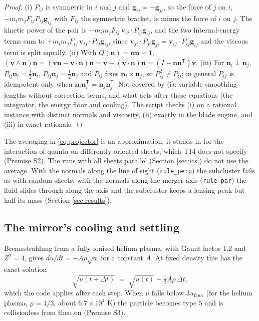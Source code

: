 \documentclass[11pt]{article}
\theoremstyle{definition}
\begin{document}
\begin{proof}
(i) $P_{ij}$ is symmetric in $i$ and $j$ and $\mathbf{g}_{ij} = -\mathbf{g}_{ji}$, so the force of $j$ on $i$, $-m_{i}m_{j}F_{ij}P_{ij}\mathbf{g}_{ij}$ with $F_{ij}$ the symmetric bracket, is minus the force of $i$ on $j$. The kinetic power of the pair is $-m_{i}m_{j}F_{ij}\,\mathbf{v}_{ij}\cdot P_{ij}\mathbf{g}_{ij}$, and the two internal-energy terms sum to $+m_{i}m_{j}F_{ij}\,\mathbf{v}_{ij}\cdot P_{ij}\mathbf{g}_{ij}$, since $\mathbf{v}_{ji}\cdot P_{ji}\mathbf{g}_{ji} = \mathbf{v}_{ij}\cdot P_{ij}\mathbf{g}_{ij}$ and the viscous term is split equally. (ii) With $Q(\mathbf{n}) = \mathbf{n}\mathbf{n} = 1$, $(\mathbf{v}\wedge\mathbf{n})\mathbf{n} = (\mathbf{v}\mathbf{n} - \mathbf{v}\cdot\mathbf{n})\mathbf{n} = \mathbf{v} - (\mathbf{v}\cdot\mathbf{n})\mathbf{n} = (I - \mathbf{n}\mathbf{n}^{\mathsf T})\mathbf{v}$. (iii) For $\mathbf{n}_{i}\perp\mathbf{n}_{j}$, $P_{ij}\mathbf{n}_{i} = \tfrac{1}{2}\mathbf{n}_{i}$, $P_{ij}\mathbf{n}_{j} = \tfrac{1}{2}\mathbf{n}_{j}$ and $P_{ij}$ fixes $\mathbf{n}_{i}\times\mathbf{n}_{j}$, so $P_{ij}^{2} \ne P_{ij}$; in general $P_{ij}$ is idempotent only when $\mathbf{n}_{i}\mathbf{n}_{i}^{\mathsf T} = \mathbf{n}_{j}\mathbf{n}_{j}^{\mathsf T}$. Not covered by (i): variable smoothing lengths without correction terms, and what acts after these equations (the integrator, the energy floor and cooling). The script checks (i) on a rational instance with distinct normals and viscosity, (ii) exactly in the blade engine, and (iii) in exact rationals.
\end{proof}

The averaging in \eqref{eq:projector} is an approximation: it stands in for the interaction of quanta on differently oriented sheets, which T14 does not specify (Premise S2). The runs with all sheets parallel (Section \ref{sec:ics}) do not use the average. With the normals along the line of sight (\texttt{rule\_perp}) the subcluster fails as with random sheets; with the normals along the merger axis (\texttt{rule\_par}) the fluid slides through along the axis and the subcluster keeps a lensing peak but half its mass (Section \ref{sec:results}).

\subsection{The mirror's cooling and settling}

Bremsstrahlung from a fully ionised helium plasma, with Gaunt factor $1.2$ and $Z^{2} = 4$, gives $du/dt = -A\rho\sqrt{u}$ for a constant $A$. At fixed density this has the exact solution
\[
\sqrt{u(t + \Delta t)} \;=\; \sqrt{u(t)} - \tfrac{1}{2}A\rho\,\Delta t ,
\]
which the code applies after each step. When $u$ falls below $3u_{\mathrm{floor}}$ (for the helium plasma, $\mu = 4/3$, about $6.7 \times 10^{4}$ K) the particle becomes type $5$ and is collisionless from then on (Premise S3).
\end{document}
